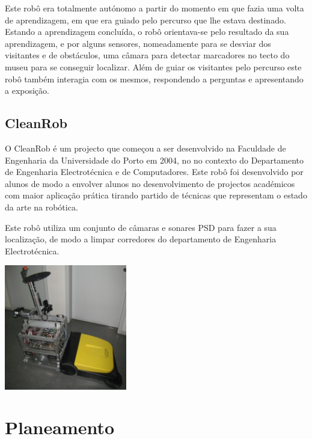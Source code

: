 Este robô era totalmente autónomo a partir do momento em que fazia uma volta de
aprendizagem, em que era guiado pelo percurso que lhe estava destinado. Estando
a aprendizagem concluída, o robô orientava-se pelo resultado da sua aprendizagem,
e por alguns sensores, nomeadamente para se desviar dos visitantes e de obstáculos,
uma câmara para detectar marcadores no tecto do museu para se conseguir localizar.
Além de guiar os visitantes pelo percurso este robô também interagia com os mesmos,
respondendo a perguntas e apresentando a exposição.

\subsection{CleanRob}

O CleanRob é um projecto que começou a ser desenvolvido na Faculdade de Engenharia da 
Universidade do Porto em 2004, no no contexto do Departamento de Engenharia
Electrotécnica e de Computadores. Este robô foi desenvolvido por alunos de modo a
envolver alunos no desenvolvimento de projectos académicos com maior aplicação prática
tirando partido de técnicas que representam o estado da arte na robótica.

Este robô utiliza um conjunto de câmaras e sonares PSD para fazer a sua localização,
de modo a limpar corredores do departamento de Engenharia Electrotécnica.

\begin{center}
	\includegraphics[width=0.40\textwidth]{figures/clean_rob.jpeg}
	\label{fig:6}
\end{center}


\section{Planeamento}

